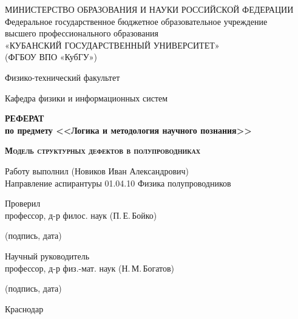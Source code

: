 \documentclass[a4paper, 14pt, titlepage]{extarticle}
\author{\theauthor,\\ кафедра физики и информационных систем КубГУ}
\title{\thetitle}
\date{\today{} \currenttime}
\newcommand{\thetitle}{Модель структурных дефектов в полупроводниках}
\begin{document}

  \maketitle
  \newpage

  \thispagestyle{empty}
  \begin {center}
  \small{МИНИСТЕРСТВО ОБРАЗОВАНИЯ И НАУКИ РОССИЙСКОЙ ФЕДЕРАЦИИ}\\
  Федеральное государственное бюджетное образовательное учреждение\\
  высшего профессионального образования\\
  «КУБАНСКИЙ ГОСУДАРСТВЕННЫЙ УНИВЕРСИТЕТ»\\
  (ФГБОУ ВПО «КубГУ»)

  Физико-технический факультет

  \vspace {1cm}

  Кафедра физики и информационных систем

  \vspace {5cm}

  \textbf{РЕФЕРАТ \\ по предмету <<Логика и методология научного познания>>}

  \vspace {0.5cm}

  \textbf{ \large \scshape \thetitle } 

  \vspace {1.5cm}

  \begin{flushleft}
    Работу выполнил \hrulefill{}  (Новиков Иван Александрович)\\
    Направление аспирантуры 01.04.10 Физика полупроводников

    Проверил\\
    профессор, д-р филос. наук \hrulefill{} (П.\,Е.\,Бойко)
    \\[-3mm]{\footnotesize\centering (подпись, дата)\par}

    Научный руководитель\\
    профессор, д-р физ.-мат. наук \hrulefill{} (Н.\,М.\,Богатов)
    \\[-3mm]{\footnotesize\centering (подпись, дата)\par}

  \end{flushleft}

  \vfill

  Краснодар \the\year
  \end {center}
\end{document}
